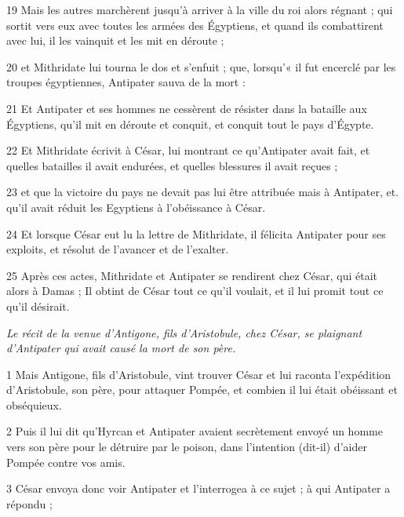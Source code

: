 \par 19 Mais les autres marchèrent jusqu'à arriver à la ville du roi alors régnant ; qui sortit vers eux avec toutes les armées des Égyptiens, et quand ils combattirent avec lui, il les vainquit et les mit en déroute ;

\par 20 et Mithridate lui tourna le dos et s'enfuit ; que, lorsqu'« il fut encerclé par les troupes égyptiennes, Antipater sauva de la mort :

\par 21 Et Antipater et ses hommes ne cessèrent de résister dans la bataille aux Égyptiens, qu'il mit en déroute et conquit, et conquit tout le pays d'Égypte.

\par 22 Et Mithridate écrivit à César, lui montrant ce qu'Antipater avait fait, et quelles batailles il avait endurées, et quelles blessures il avait reçues ;

\par 23 et que la victoire du pays ne devait pas lui être attribuée mais à Antipater, et. qu'il avait réduit les Egyptiens à l'obéissance à César.

\par 24 Et lorsque César eut lu la lettre de Mithridate, il félicita Antipater pour ses exploits, et résolut de l'avancer et de l'exalter.

\par 25 Après ces actes, Mithridate et Antipater se rendirent chez César, qui était alors à Damas ; Il obtint de César tout ce qu'il voulait, et il lui promit tout ce qu'il désirait.


\par \textit{Le récit de la venue d'Antigone, fils d'Aristobule, chez César, se plaignant d'Antipater qui avait causé la mort de son père.}

\par 1 Mais Antigone, fils d'Aristobule, vint trouver César et lui raconta l'expédition d'Aristobule, son père, pour attaquer Pompée, et combien il lui était obéissant et obséquieux.

\par 2 Puis il lui dit qu'Hyrcan et Antipater avaient secrètement envoyé un homme vers son père pour le détruire par le poison, dans l'intention (dit-il) d'aider Pompée contre vos amis.

\par 3 César envoya donc voir Antipater et l'interrogea à ce sujet ; à qui Antipater a répondu ;

